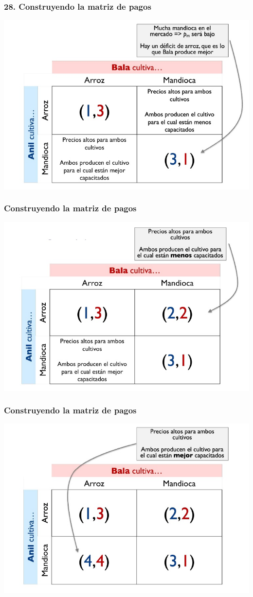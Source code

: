 \documentclass{beamer}
\begin{document}
\begin{frame}
\frametitle{28. Construyendo la matriz de pagos}
\centering
\includegraphics[scale=0.6]{Figures/Tema_03_9_bala.jpg}
\end{frame}

\begin{frame}
\frametitle{ Construyendo la matriz de pagos}
\centering
\includegraphics[scale=0.6]{Figures/Tema_03_10_bala.jpg}
\end{frame}

\begin{frame}
\frametitle{Construyendo la matriz de pagos}
\centering
\includegraphics[scale=0.6]{Figures/Tema_03_11_bala.jpg}
\end{frame}
\end{document}
